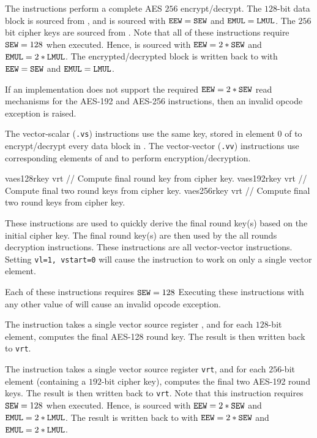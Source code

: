The  instructions perform a complete
AES $256$ encrypt/decrypt.
The $128$-bit data block is sourced from \vrt, and is sourced with
${\tt EEW}={\tt SEW}$ and ${\tt EMUL}={\tt LMUL}$.
The $256$ bit cipher keys are sourced from .
Note that all of these instructions require ${\tt SEW}=128$ when executed.
Hence,  is sourced with ${\tt EEW}=2*{\tt SEW}$ and ${\tt EMUL}=2*{\tt LMUL}$.
The encrypted/decrypted block is written back to \vrt with
${\tt EEW}={\tt SEW}$ and ${\tt EMUL}={\tt LMUL}$.

If an implementation does not support the required ${\tt EEW}=2*{\tt SEW}$
read mechanisms for the AES-192 and AES-256 instructions, then an invalid
opcode exception is raised.

The vector-scalar ({\tt *.vs}) instructions use the same key, stored
in element $0$ of  to encrypt/decrypt every data block in \vrt.
The vector-vector ({\tt *.vv}) instructions use corresponding elements
of  and \vrt to perform encryption/decryption.

\begin{cryptoisa}
vaes128rkey vrt    // Compute final round key from cipher key.
vaes192rkey vrt    // Compute final two round keys from cipher key.
vaes256rkey vrt    // Compute final two round keys from cipher key.
\end{cryptoisa}

These instructions are used to quickly derive the final round key(s)
based on the initial cipher key.
The final round key(s) are then used by the all rounds decryption
instructions.
These instructions are all vector-vector instructions.
Setting {\tt vl=1, vstart=0} will cause the instruction to work on only a
single vector element.

Each of these instructions requires ${\tt SEW}=128$
Executing these instructions with any other value of \SEW will cause
an invalid opcode exception.

The  instruction takes a single
vector source register \vrt, and for each $128$-bit element, computes
the final AES-128 round key.
The result is then written back to {\tt vrt}.

The  instruction takes a single
vector source register {\tt vrt}, and for each $256$-bit element
(containing a $192$-bit cipher key),
computes the final two AES-192 round keys.
The result is then written back to {\tt vrt}.
Note that this instruction requires ${\tt SEW}=128$ when executed.
Hence, \vrt is sourced with ${\tt EEW}=2*{\tt SEW}$ and ${\tt EMUL}=2*{\tt LMUL}$.
The result is written back to \vrt with
${\tt EEW}=2*{\tt SEW}$ and ${\tt EMUL}=2*{\tt LMUL}$.

